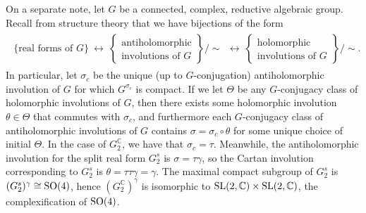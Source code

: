 \noindent On a separate note, let $G$ be a connected, complex, reductive algebraic group. Recall from structure theory that we have bijections of the form
\begin{align*}
\begin{split}
\{\text{real forms of $G$}\}\ \longleftrightarrow\ \left\{\begin{matrix}\text{antiholomorphic}\\\text{involutions of $G$}\end{matrix}\right\}\!\big/\!\!\sim\ \ \longleftrightarrow\ \left\{\begin{matrix}\text{holomorphic}\\\text{involutions of $G$}\end{matrix}\right\}\!\big/\!\!\sim.
\end{split}
\end{align*}
\noindent In particular, let $\sigma_c$ be the unique (up to $G$-conjugation) antiholomorphic involution of $G$ for which $G^{\sigma_c}$ is compact. If we let $\Theta$ be any $G$-conjugacy class of holomorphic involutions of $G$, then there exists some holomorphic involution $\theta \in \Theta$ that commutes with $\sigma_c$, and furthermore each $G$-conjugacy class of antiholomorphic involutions of $G$ contains $\sigma = \sigma_c \circ \theta$ for some unique choice of initial $\Theta$. In the case of $G_2^\mathbb{C}$, we have that $\sigma_c = \tau$. Meanwhile, the antiholomorphic involution for the split real form $G_2^s$ is $\sigma = \tau\gamma$, so the Cartan involution corresponding to $G_2^s$ is $\theta = \tau\tau\gamma = \gamma$. The maximal compact subgroup of $G_2^s$ is $(G_2^s)^\gamma \cong \textup{SO}(4)$, hence $(G_2^\mathbb{C})^\gamma$ is isomorphic to $\textup{SL}(2, \mathbb{C}) \times \textup{SL}(2, \mathbb{C})$, the complexification of $\textup{SO}(4)$.

\newpage
\renewcommand\thesection{R}
\begingroup
\setlength{\emergencystretch}{.5em}
\printbibliography[heading=none]
\endgroup

